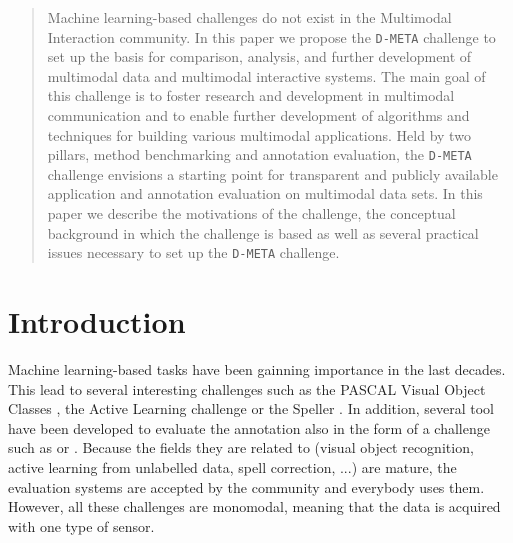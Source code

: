 \documentclass{sig-alternate}
\begin{document}
\maketitle
\begin{abstract}
Machine learning-based challenges do not exist in the Multimodal Interaction community. In this paper we propose the
\texttt{D-META} challenge to set up the basis for comparison, analysis, and further development of multimodal data and
multimodal interactive systems. The main goal of this challenge is to foster research and development in multimodal
communication and to enable further development of algorithms and techniques for building various multimodal
applications. Held by two pillars, method benchmarking and annotation evaluation, the \texttt{D-META} challenge
envisions a starting point for transparent and publicly available application and annotation evaluation on multimodal
data sets. In this paper we describe the motivations of the challenge, the conceptual background in which the challenge
is based as well as several practical issues necessary to set up the \texttt{D-META} challenge.
\end{abstract}
\section{Introduction}
Machine learning-based tasks have been gainning importance in the last decades. This lead to several interesting
challenges such as the PASCAL Visual Object Classes \cite{PascalVOC}, the Active Learning challenge
\cite{ActiveLearning} or the Speller \cite{Speller}. In addition, several tool have been developed to evaluate the
annotation also in the form of a challenge such as \cite{Give} or \cite{SDS}. Because the fields they are related to
(visual object recognition, active learning from unlabelled data, spell correction, ...) are mature, the
evaluation systems are accepted by the community and everybody uses them. However, all these challenges are monomodal,
meaning that the data is acquired with one type of sensor.\vspace{0.3cm}
\end{document}

